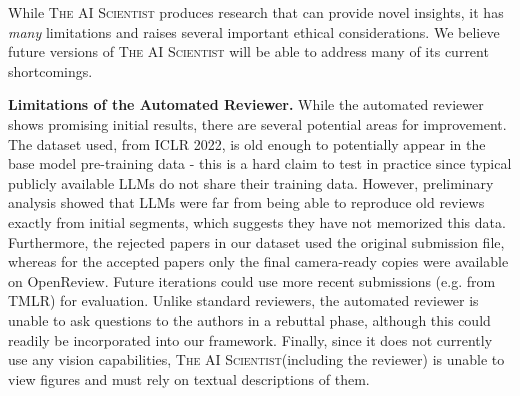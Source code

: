 \documentclass[11pt, a4paper]{include/gdm_format}
\newcommand{\ouralgo}{\textsc{The AI Scientist}\xspace}
\begin{document}
While \ouralgo produces research that can provide novel insights, it has \textit{many} limitations and raises several important ethical considerations.
We believe future versions of \ouralgo will be able to address many of its current shortcomings.

\textbf{Limitations of the Automated Reviewer.}
While the automated reviewer shows promising initial results, there are several potential areas for improvement.
The dataset used, from ICLR 2022, is old enough to potentially appear in the base model pre-training data - this is a hard claim to test in practice since typical publicly available LLMs do not share their training data.
However, preliminary analysis showed that LLMs were far from being able to reproduce old reviews exactly from initial segments, which suggests they have not memorized this data.
Furthermore, the rejected papers in our dataset used the original submission file, whereas for the accepted papers only the final camera-ready copies were available on OpenReview.
Future iterations could use more recent submissions (e.g. from TMLR) for evaluation.
Unlike standard reviewers, the automated reviewer is unable to ask questions to the authors in a rebuttal phase, although this could readily be incorporated into our framework.
Finally, since it does not currently use any vision capabilities, \ouralgo (including the reviewer) is unable to view figures and must rely on textual descriptions of them.
\end{document}
